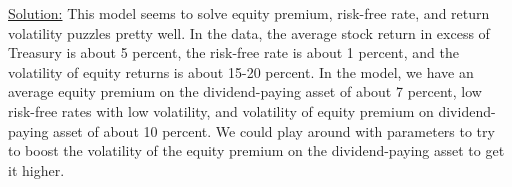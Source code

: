\documentclass{article}
\begin{document}
\begin{enumerate}
\bigskip

\underline{Solution:}  This model seems to solve equity premium, risk-free rate, and return volatility puzzles pretty well.  In the data, the average stock return in excess of Treasury is about 5 percent, the risk-free rate is about 1 percent, and the volatility of equity returns is about 15-20 percent.  In the model, we have an average equity premium on the dividend-paying asset of about 7 percent, low risk-free rates with low volatility, and volatility of equity premium on dividend-paying asset of about 10 percent. We could play around with parameters to try to boost the volatility of the equity premium on the dividend-paying asset to get it higher.

\end{enumerate}
\end{document}
